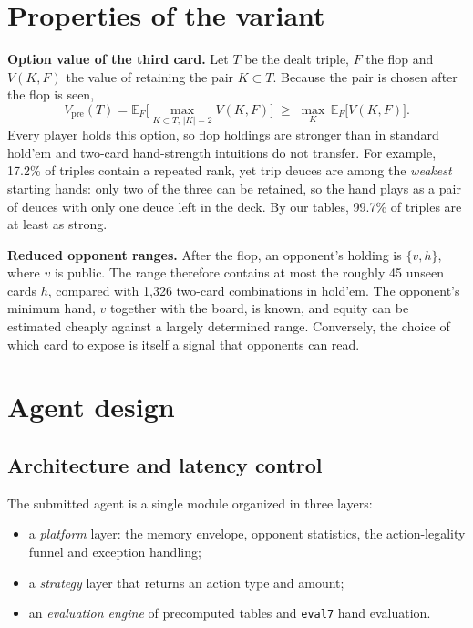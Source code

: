 \documentclass[10pt]{article}
\begin{document}
\section{Properties of the variant}

\textbf{Option value of the third card.} Let $T$ be the dealt triple, $F$ the flop and $V(K,F)$ the value of retaining the pair $K\subset T$. Because the pair is chosen after the flop is seen,
\[
V_{\text{pre}}(T)=\mathbb{E}_F\Big[\max_{K\subset T,\,|K|=2}V(K,F)\Big]\;\ge\;\max_{K}\,\mathbb{E}_F\big[V(K,F)\big].
\]
Every player holds this option, so flop holdings are stronger than in standard hold'em and two-card hand-strength intuitions do not transfer. For example, 17.2\% of triples contain a repeated rank, yet trip deuces are among the \emph{weakest} starting hands: only two of the three can be retained, so the hand plays as a pair of deuces with only one deuce left in the deck. By our tables, 99.7\% of triples are at least as strong.

\textbf{Reduced opponent ranges.} After the flop, an opponent's holding is $\{v,h\}$, where $v$ is public. The range therefore contains at most the roughly 45 unseen cards $h$, compared with 1,326 two-card combinations in hold'em. The opponent's minimum hand, $v$ together with the board, is known, and equity can be estimated cheaply against a largely determined range. Conversely, the choice of which card to expose is itself a signal that opponents can read.

\section{Agent design}

\subsection{Architecture and latency control}
The submitted agent is a single module organized in three layers:
\begin{itemize}
\item a \emph{platform} layer: the memory envelope, opponent statistics, the action-legality funnel and exception handling;
\item a \emph{strategy} layer that returns an action type and amount;
\item an \emph{evaluation engine} of precomputed tables and \texttt{eval7} hand evaluation.
\end{itemize}
\end{document}
